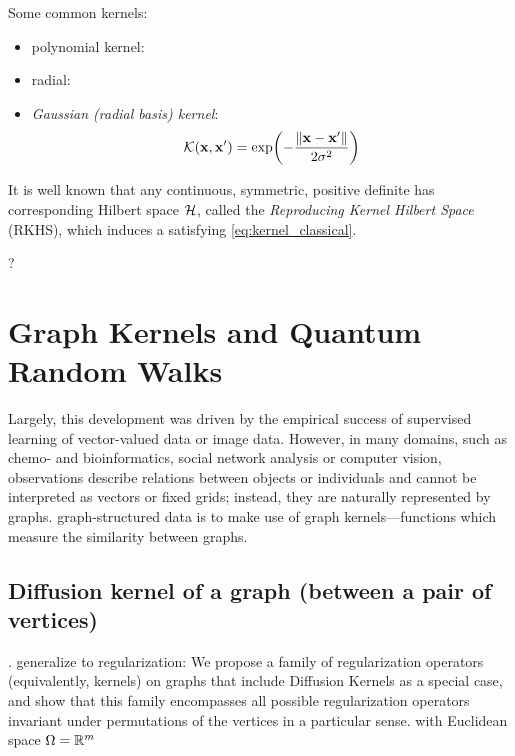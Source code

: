 Some common kernels: 
\begin{itemize}
	\item polynomial kernel:
	\item radial:
	\item \emph{Gaussian (radial basis) kernel}:
	\begin{equation}
		\mathcal{K}(\vb{x},\vb{x}') = 
		\exp(-\frac{\norm{\vb{x}-\vb{x}'}}{2\sigma^2})
	\end{equation}
\end{itemize}

\begin{definition}
	It is well known that any continuous, symmetric, positive definite  has corresponding Hilbert space $\mathcal{H}$, called the \emph{Reproducing Kernel Hilbert Space} (RKHS),
	which induces a 
	satisfying \cref{eq:kernel_classical}.
\end{definition}
\begin{theorem}
	?
\end{theorem}

\section{Graph Kernels and Quantum Random Walks}
Largely, this development was driven by the empirical success of supervised learning of vector-valued data or image data. However, in many domains, such as chemo- and bioinformatics, social network analysis or computer vision, observations describe relations between objects or individuals and cannot be interpreted as vectors or fixed grids; instead, they are naturally represented by graphs.
\cite{kriegeSurveyGraphKernels2020}
graph-structured data is to make use of graph kernels—functions which measure the similarity between graphs.

\subsection{Diffusion kernel of a graph (between a pair of vertices)}
\cite{kondorDiffusionKernelsGraphs2002}.
generalize to regularization: 
We propose a family of regularization operators (equivalently, kernels) on graphs that include Diffusion Kernels as a special case, and show that this family encompasses all possible regularization operators invariant under permutations of the vertices in a particular sense.
\cite{smolaKernelsRegularizationGraphs2003}
with Euclidean space $\Omega = \mathbb{R}^m$

